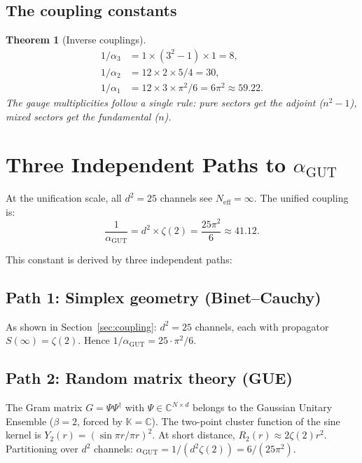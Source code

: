 \documentclass[12pt]{amsart}
\newtheorem{theorem}{Theorem}[section]
\theoremstyle{definition}
\theoremstyle{remark}
\newcommand{\CC}{\mathbb{C}}
\newcommand{\agut}{\alpha_{\mathrm{GUT}}}
\begin{document}
\subsection{The coupling constants}

\begin{theorem}[Inverse couplings]
\label{thm:couplings}
\begin{align}
1/\alpha_3 &= 1 \times (3^2 - 1) \times 1
  = 8, \\
1/\alpha_2 &= 12 \times 2 \times 5/4
  = 30, \\
1/\alpha_1 &= 12 \times 3 \times \pi^2/6
  = 6\pi^2 \approx 59.22.
\end{align}
The gauge multiplicities follow a single rule:
pure sectors get the adjoint ($n^2 - 1$),
mixed sectors get the fundamental ($n$).
\end{theorem}

\section{Three Independent Paths to $\agut$}
\label{sec:three_paths}

At the unification scale,
all $d^2 = 25$ channels see
$N_{\mathrm{eff}} = \infty$.
The unified coupling is:
\begin{equation}
\frac{1}{\agut}
= d^2 \times \zeta(2)
= \frac{25\pi^2}{6}
\approx 41.12.
\end{equation}

This constant is derived by three independent paths:

\subsection{Path 1: Simplex geometry (Binet--Cauchy)}

As shown in Section~\ref{sec:coupling}:
$d^2 = 25$ channels, each with propagator
$S(\infty) = \zeta(2)$.
Hence $1/\agut = 25 \cdot \pi^2/6$.

\subsection{Path 2: Random matrix theory (GUE)}

The Gram matrix $G = \Psi\Psi^{\dagger}$
with $\Psi \in \CC^{N \times d}$ belongs
to the Gaussian Unitary Ensemble
($\beta = 2$, forced by $\mathbb{K} = \CC$).
The two-point cluster function of the
sine kernel is
$Y_2(r) = (\sin \pi r / \pi r)^2$.
At short distance,
$R_2(r) \approx 2\zeta(2) r^2$.
Partitioning over $d^2$ channels:
$\agut = 1/(d^2 \zeta(2)) = 6/(25\pi^2)$.
\end{document}
